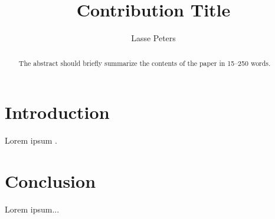 \documentclass{article}
\begin{document}
%
\title{Contribution Title}
\author{Lasse Peters}

\maketitle
%
\begin{abstract}
The abstract should briefly summarize the contents of the paper in
15--250 words.
\end{abstract}

\section{Introduction}

Lorem ipsum \cite{lowry1951protein}.

\section{Conclusion}

Lorem ipsum...

\printbibliography
\end{document}
